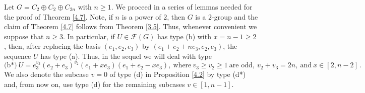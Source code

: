 \documentclass[a4paper, 10pt]{amsart}
\theoremstyle{plain}
\theoremstyle{definition}
\numberwithin{equation}{section}
\begin{document}
Let $G = C_2 \oplus C_2 \oplus C_{2n}$ with $n\geq 1$. We proceed in a series of lemmas needed for the proof of Theorem \ref{4.7}. Note, 
if $n$ is a power of $2$, then $G$ is a $2$-group and the claim of Theorem \ref{4.7} follows from  Theorem \ref{3.5}.  Thus, whenever convenient we suppose that $n \ge 3$. In particular, if $U \in \mathcal F (G)$ has type (b) with 
$x=n-1 \ge 2$, then, after replacing the basis $(e_1,e_2,e_3)$ by $(e_1+e_2+ne_3,e_2,e_3)$,
the sequence $U$ has type (a). Thus, in the sequel we will deal with type
\[
\text{(b*)} \  U = e_3^{v_3} (e_2+e_3)^{v_2} (e_1+xe_3) (e_1+e_2-xe_3), \ \text{where} \ v_3 \ge v_2\geq 1 \ \text{are odd},  \ v_2+v_3=2n, \ \text{and} \ x \in [2, n-2] \,.
\]
We also denote the subcase $v=0$ of type (d) in Proposition \ref{4.2} by type (d*) and, from now on, use type (d) for the remaining subcases $v \in [1, n-1]$.
\end{document}
